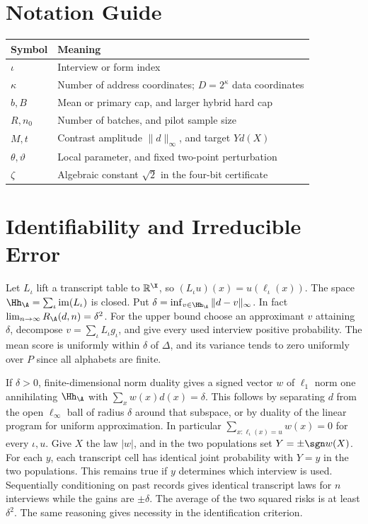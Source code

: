 \section*{Notation Guide}
\begin{center}
\begin{tabular}{ll}
\toprule
Symbol & Meaning\\
\midrule
$\iota$ & Interview or form index\\
$\kappa$ & Number of address coordinates; $D=2^\kappa$ data coordinates\\
$b,B$ & Mean or primary cap, and larger hybrid hard cap\\
$R,n_0$ & Number of batches, and pilot sample size\\
$M,t$ & Contrast amplitude $\|d\|_\infty$, and target $Yd(X)$\\
$\theta,\vartheta$ & Local parameter, and fixed two-point perturbation\\
$\zeta$ & Algebraic constant $\sqrt2$ in the four-bit certificate\\
\bottomrule
\end{tabular}
\end{center}

\section{Identifiability and Irreducible Error}\label{app:id}
Let $L_\iota$ lift a transcript table to $\mathbb R^{\X}$, so $(L_\iota u)(x)=u(\ell_\iota(x))$. The space $\Hh_\A=\sum_\iota\mathrm{im}(L_\iota)$ is closed. Put $\delta=\inf_{v\in\Hh_\A}\|d-v\|_\infty$. In fact $\lim_{n\to\infty} R_\A(d,n)=\delta^2$. For the upper bound choose an approximant $v$ attaining $\delta$, decompose $v=\sum_\iota L_\iota g_\iota$, and give every used interview positive probability. The mean score is uniformly within $\delta$ of $\Delta$, and its variance tends to zero uniformly over $P$ since all alphabets are finite.

If $\delta>0$, finite-dimensional norm duality gives a signed vector $w$ of $\ell_1$ norm one annihilating $\Hh_\A$ with $\sum_xw(x)d(x)=\delta$. This follows by separating $d$ from the open $\ell_\infty$ ball of radius $\delta$ around that subspace, or by duality of the linear program for uniform approximation. In particular $\sum_{x:\ell_\iota(x)=u} w(x)=0$ for every $\iota,u$. Give $X$ the law $|w|$, and in the two populations set $Y=\pm\sgn w(X)$. For each $y$, each transcript cell has identical joint probability with $Y=y$ in the two populations. This remains true if $y$ determines which interview is used. Sequentially conditioning on past records gives identical transcript laws for $n$ interviews while the gains are $\pm\delta$. The average of the two squared risks is at least $\delta^2$. The same reasoning gives necessity in the identification criterion.

